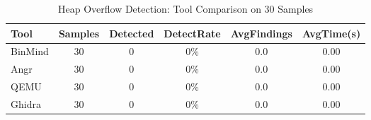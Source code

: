 \begin{table}[htbp]
\centering
\caption{Heap Overflow Detection: Tool Comparison on 30 Samples}
\label{tab:heap_comparison}
\begin{tabular}{lccccc}
\toprule
Tool & Samples & Detected & DetectRate & AvgFindings & AvgTime(s) \\
\midrule
BinMind & 30 & 0 & 0\% & 0.0 & 0.00 \\
Angr & 30 & 0 & 0\% & 0.0 & 0.00 \\
QEMU & 30 & 0 & 0\% & 0.0 & 0.00 \\
Ghidra & 30 & 0 & 0\% & 0.0 & 0.00 \\
\bottomrule
\end{tabular}
\end{table}